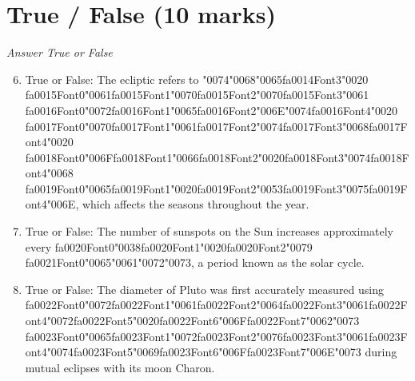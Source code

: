 \documentclass[12pt]{article}
\begin{document}
\section*{True / False (10 marks)}
\textit{Answer True or False}
\begin{enumerate}[label=\arabic*.]
\setcounter{enumi}{5}
\item True or False: The ecliptic refers to {\char"0074}{\char"0068}{\char"0065}{\csname fa0014Font3\endcsname\char"0020} {\csname fa0015Font0\endcsname\char"0061}{\csname fa0015Font1\endcsname\char"0070}{\csname fa0015Font2\endcsname\char"0070}{\csname fa0015Font3\endcsname\char"0061} {\csname fa0016Font0\endcsname\char"0072}{\csname fa0016Font1\endcsname\char"0065}{\csname fa0016Font2\endcsname\char"006E}{\char"0074}{\csname fa0016Font4\endcsname\char"0020} {\csname fa0017Font0\endcsname\char"0070}{\csname fa0017Font1\endcsname\char"0061}{\csname fa0017Font2\endcsname\char"0074}{\csname fa0017Font3\endcsname\char"0068}{\csname fa0017Font4\endcsname\char"0020} {\csname fa0018Font0\endcsname\char"006F}{\csname fa0018Font1\endcsname\char"0066}{\csname fa0018Font2\endcsname\char"0020}{\csname fa0018Font3\endcsname\char"0074}{\csname fa0018Font4\endcsname\char"0068} {\csname fa0019Font0\endcsname\char"0065}{\csname fa0019Font1\endcsname\char"0020}{\csname fa0019Font2\endcsname\char"0053}{\csname fa0019Font3\endcsname\char"0075}{\csname fa0019Font4\endcsname\char"006E}, which affects the seasons throughout the year.
\item True or False: The number of sunspots on the Sun increases approximately every {\csname fa0020Font0\endcsname\char"0038}{\csname fa0020Font1\endcsname\char"0020}{\csname fa0020Font2\endcsname\char"0079} {\csname fa0021Font0\endcsname\char"0065}{\char"0061}{\char"0072}{\char"0073}, a period known as the solar cycle.
\item True or False: The diameter of Pluto was first accurately measured using {\csname fa0022Font0\endcsname\char"0072}{\csname fa0022Font1\endcsname\char"0061}{\csname fa0022Font2\endcsname\char"0064}{\csname fa0022Font3\endcsname\char"0061}{\csname fa0022Font4\endcsname\char"0072}{\csname fa0022Font5\endcsname\char"0020}{\csname fa0022Font6\endcsname\char"006F}{\csname fa0022Font7\endcsname\char"0062}{\char"0073} {\csname fa0023Font0\endcsname\char"0065}{\csname fa0023Font1\endcsname\char"0072}{\csname fa0023Font2\endcsname\char"0076}{\csname fa0023Font3\endcsname\char"0061}{\csname fa0023Font4\endcsname\char"0074}{\csname fa0023Font5\endcsname\char"0069}{\csname fa0023Font6\endcsname\char"006F}{\csname fa0023Font7\endcsname\char"006E}{\char"0073} during mutual eclipses with its moon Charon.

\end{enumerate}
\end{document}
